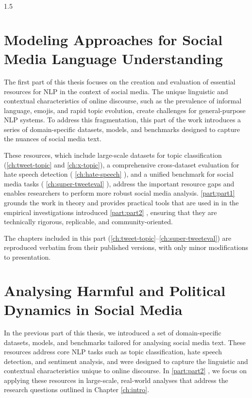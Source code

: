 \documentclass[12pt,twoside]{report}
\newcommand\PARTONE{Modeling Approaches for Social Media Language Understanding}
\newcommand\PARTTWO{Analysing Harmful and Political Dynamics in Social Media}
\def\subsectionautorefname{\S\!}%
\def\sectionautorefname{\S\!}%
\let\subsectionautorefname\sectionautorefname
\newcommand{\Autoref}[1]{%
  \begingroup%
  \def\chapterautorefname{Chapter}%
  \def\sectionautorefname{Section}%
  \def\subsectionautorefname{Subsection}%
  \autoref{#1}%
  \endgroup%
}
\begin{document}
\begin{flushleft}
\begin{spacing}{1.5}
\pagestyle{fancy}
\fancyhead{} %
\fancyhead[L]{\nouppercase\leftmark}
\fancyfoot{}
\fancyfoot[C]{\thepage}

\newcommand{\dimos}[1]{\textcolor{black}{#1}}






\part{\PARTONE}\label{part:part1}
The first part of this thesis focuses on the creation and evaluation of essential resources for \ac{NLP} in the context of social media. The unique linguistic and contextual characteristics of online discourse, such as the prevalence of informal language, emojis, and rapid topic evolution, create challenges for general-purpose NLP systems. To address this fragmentation, this part of the work introduces a series of domain-specific datasets, models, and benchmarks designed to capture the nuances of social media text. 

These resources, which include large-scale datasets for topic classification (\ref{ch:tweet-topic} and \ref{ch:x-topic}), a comprehensive cross-dataset evaluation for hate speech detection (\Autoref{ch:hate-speech}), and a unified benchmark for social media tasks (\Autoref{ch:super-tweeteval}), address the important resource gaps and enables researchers to perform more robust social media analysis. \Autoref{part:part1} grounds the work in theory and provides practical tools that are used in  in the empirical investigations introduced \Autoref{part:part2}, ensuring that they are technically rigorous, replicable, and community-oriented.

The chapters included in this part (\ref{ch:tweet-topic}–\ref{ch:super-tweeteval}) are reproduced verbatim from their published versions, with only minor modifications to presentation.






\part{\PARTTWO}\label{part:part2}
In the previous part of this thesis, we introduced a set of domain-specific datasets, models, and benchmarks tailored for analysing social media text. These resources address core \ac{NLP} tasks such as topic classification, hate speech detection, and sentiment analysis, and were designed to capture the linguistic and contextual characteristics unique to online discourse. In \Autoref{part:part2}, we focus on applying these resources in large-scale, real-world analyses that address the research questions outlined in Chapter \ref{ch:intro}.


\end{spacing}
\end{flushleft}
\end{document}
